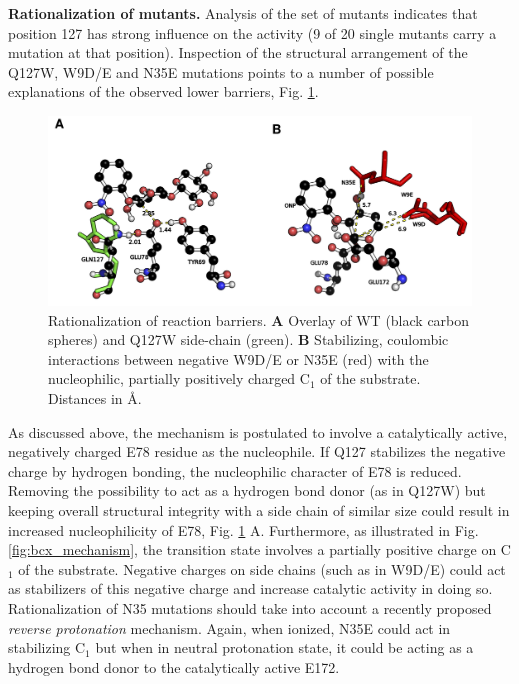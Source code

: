 \newline
\textbf{Rationalization of mutants.}
Analysis of the set of mutants indicates that position 127 has strong influence on the activity (9 of 20 single mutants carry a mutation at that position).
Inspection of the structural arrangement of the Q127W, W9D/E and N35E mutations points to a number of possible explanations of the observed lower barriers, Fig. \ref{fig:bcx_rationalization}.
\begin{figure}[htbp] 
\centering
\includegraphics[width=0.99\linewidth]{analyse-charge.png}
\caption{
Rationalization of reaction barriers.
\textbf{A} Overlay of WT (black carbon spheres) and Q127W side-chain (green).
\textbf{B} Stabilizing, coulombic interactions between negative W9D/E or N35E (red) with the nucleophilic, partially positively charged C$_1$ of the substrate.
Distances in \AA\cite{hediger2013computational}.
}
\label{fig:bcx_rationalization}
\end{figure}
As discussed above, the mechanism is postulated to involve a catalytically active, negatively charged E78 residue as the nucleophile.
If Q127 stabilizes the negative charge by hydrogen bonding, the nucleophilic character of E78 is reduced.
Removing the possibility to act as a hydrogen bond donor (as in Q127W) but keeping overall structural integrity with a side chain of similar size could result in increased nucleophilicity of E78, Fig. \ref{fig:bcx_rationalization} A.
Furthermore, as illustrated in Fig. \ref{fig:bcx_mechanism}, the transition state involves a partially positive charge on C$_1$ of the substrate.
Negative charges on side chains (such as in W9D/E) could act as stabilizers of this negative charge and increase catalytic activity in doing so.
Rationalization of N35 mutations should take into account a recently proposed \textit{reverse protonation} mechanism\cite{joshi2000hydrogen}.
Again, when ionized, N35E could act in stabilizing C$_1$ but when in neutral protonation state, it could be acting as a hydrogen bond donor to the catalytically active E172.

